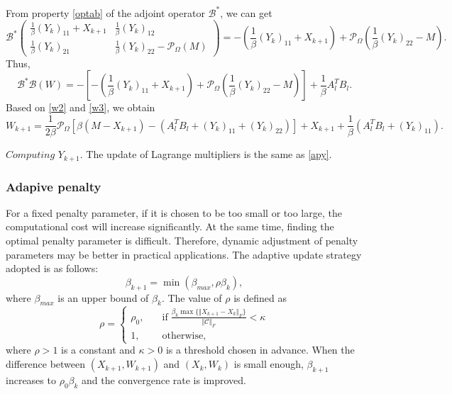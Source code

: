 \documentclass{article}
\begin{document}
{From property \eqref{optab} of the adjoint operator $\mathcal{B}^*$, we can get 
\begin{equation*}
	\mathcal{B}^* \begin{pmatrix}
				\frac{1}{\beta} (Y_k)_{11} + X_{k+1} & \frac{1}{\beta} (Y_k)_{12} \\
		\frac{1}{\beta} (Y_k)_{21} & \frac{1}{\beta} (Y_k)_{22} - \mathcal{P}_\Omega(M)
	\end{pmatrix} = -\left(\frac{1}{\beta}(Y_k)_{11} + X_{k+1} \right) + \mathcal{P}_\Omega(\frac{1}{\beta} (Y_k)_{22}-M).
\end{equation*}
Thus,
\begin{equation}
	\label{w3}
	\mathcal{B}^*\mathcal{B}(W) = - \left[-\left(\frac{1}{\beta}(Y_k)_{11} + X_{k+1} \right) + \mathcal{P}_\Omega(\frac{1}{\beta} (Y_k)_{22}-M) \right] + \frac{1}{\beta}A_l^TB_l.
\end{equation}
Based on \eqref{w2} and \eqref{w3}, we obtain
\begin{equation}
	W_{k+1} = \frac{1}{2\beta} \mathcal{P}_\Omega [\beta(M-X_{k+1}) - (A_l^TB_l + (Y_k)_{11}+ (Y_k)_{22})] + X_{k+1} +  \frac{1}{\beta}(A_l^TB_l + (Y_k)_{11}).
\end{equation}

$\textit{Computing}$  $Y_{k+1}$. The update of Lagrange multipliers is the same as \eqref{apy}.

\subsubsection{Adapive penalty}
For a fixed penalty parameter, if it is chosen to be too small or too large, the computational cost will increase significantly. At the same time, finding the optimal penalty parameter is difficult. Therefore, dynamic adjustment of penalty parameters may be better in practical applications. The adaptive update strategy adopted is as follows:
\begin{equation}
	\label{beta1}
	\beta_{k+1} = \min(\beta_{max}, \rho \beta_k),
\end{equation}
where $\beta_{max}$ is an upper bound of $\beta_k$. The value of $\rho$ is defined as
\begin{equation}
	\label{beta2}
	\rho = \left\{
		\begin{aligned}
			\rho_0, \quad & \text{if} \; \frac{\beta_k \max\{ \Vert X_{k+1} - X_k \Vert_F \}}{ \Vert \mathcal{C} \Vert_F} < \kappa \\
			1, \quad & \text{otherwise},
		\end{aligned}
	\right.
\end{equation}
where $\rho > 1$ is a constant and $\kappa >0 $ is a threshold chosen in advance. When the difference between $(X_{k+1}, W_{k+1})$ and $(X_{k}, W_{k})$ is small enough, $\beta_{k+1}$ increases to $\rho_0\beta_k$ and the convergence rate is improved.

}
\end{document}
